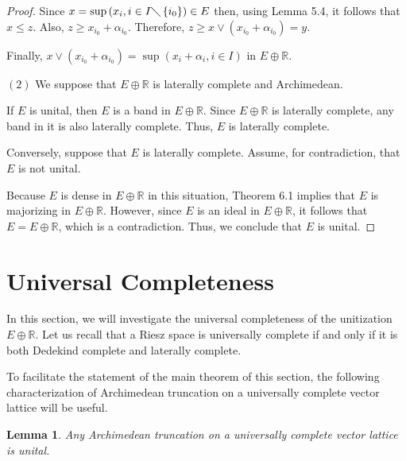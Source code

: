 \documentclass{birkau}
\numberwithin{equation}{section}
\theoremstyle{plain}
\newtheorem{lemma}[theorem]{Lemma}
\theoremstyle{definition}
\begin{document}
\begin{proof}
	Since $x=\sup \left( x_{i},i\in I\diagdown \left\{ i_{0}\right\} \right) \in
	E$ then,  using Lemma 5.4,  it follows that $x\leq z.$ Also,  $z\geq
	x_{i_{0}}+\alpha _{i_{0}}.$ Therefore,  $z\geq x\vee \left( x_{i_{0}}+\alpha
	_{i_{0}}\right) =y.$
	
	Finally,  $x\vee \left( x_{i_{0}}+\alpha _{i_{0}}\right) =\sup \left(
	x_{i}+\alpha _{i},i\in I\right) $ in $E\oplus 
	\mathbb{R}
	.$
	
	$\left( 2\right) $ We suppose that $E\oplus 
	\mathbb{R}
	$ is laterally complete and Archimedean.
	
	If $E$ is unital,  then $E$ is a band in $E\oplus 
	\mathbb{R}
	.$
	Since $E\oplus 
	\mathbb{R}
	$ is laterally complete, any band in it is also laterally complete.  Thus,  $E$
	is laterally complete.
	
	Conversely,  suppose that $E$ is laterally complete.  Assume,  for contradiction,  that $E$ is not unital. 
	
	Because $E$ is dense in $E\oplus 
	\mathbb{R}
	$ in this situation, Theorem 6.1 implies that $E$ is majorizing in $E\oplus 
	\mathbb{R}
	$.  However,  since $E$ is an ideal in $E\oplus 
	\mathbb{R}
	$,  it follows that $E=E\oplus 
	\mathbb{R}
	$,  which is a contradiction. 
	Thus,  we conclude that $E$ is unital.
\end{proof}
\section{Universal Completeness}
In this section, we will investigate the universal completeness of the
unitization $E\oplus 
\mathbb{R}
$. Let us recall that a Riesz space is universally complete if and only if
it is both Dedekind complete and laterally complete.

To facilitate the statement of the main theorem of this section, the
following characterization of Archimedean truncation on a universally
complete vector lattice will be useful.

\begin{lemma}\cite{Boulstructuretheorem}
	Any Archimedean truncation on a universally complete vector lattice is
	unital.
\end{lemma}
\end{document}
